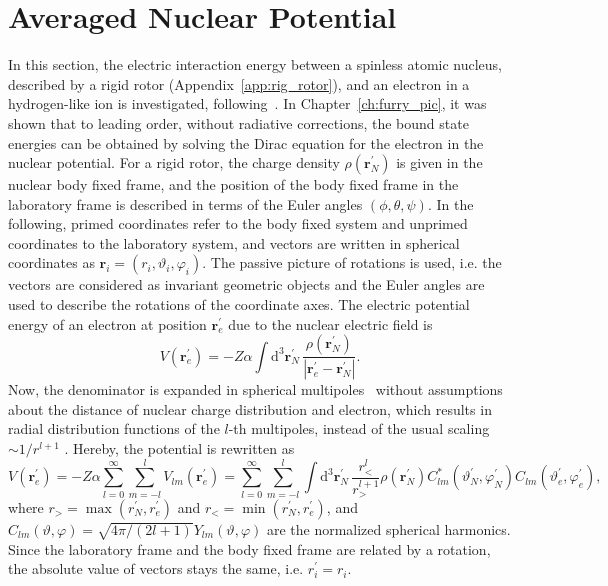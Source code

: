 \section{Averaged Nuclear Potential}
\label{sec:gfac_avpot}
In this section, the electric interaction energy between a spinless atomic nucleus, described by a rigid rotor (Appendix~\ref{app:rig_rotor}), and an electron in a hydrogen-like ion is investigated, following~\cite{kozhedub2008,jacek2012}. In Chapter~\ref{ch:furry_pic}, it was shown that to leading order, without radiative corrections, the bound state energies can be obtained by solving the Dirac equation for the electron in the nuclear potential. For a rigid rotor, the charge density $\rho(\mathbf{r}^{\prime}_N)$ is given in the nuclear body fixed frame, and the position of the body fixed frame in the laboratory frame is described in terms of the Euler angles $(\phi,\theta,\psi)$. In the following, primed coordinates refer to the body fixed system and unprimed coordinates to the laboratory system, and vectors are written in spherical coordinates as $\mathbf{r}_i=(r_i,\vartheta_i,\varphi_i)$. The passive picture of rotations is used, i.e. the vectors are considered as invariant geometric objects and the Euler angles are used to describe the rotations of the coordinate axes. The electric potential energy of an electron at position $\mathbf{r}_{e}^\prime$ due to the nuclear electric field is
\begin{equation}
V(\mathbf{r}_e^\prime)=-Z\alpha \int\mathrm{d}^3\mathbf{r}_N^\prime\,
\frac{\rho(\mathbf{r}_N^\prime)}{\left|\mathbf{r}_e^\prime - \mathbf{r}_N^\prime\right|}.
\end{equation}
Now, the denominator is expanded in spherical multipoles~\cite{jackson1999} without assumptions about the distance of nuclear charge distribution and electron, which results in radial distribution functions of the $l$-th multipoles, instead of the usual scaling $\sim 1/r^{l+1}$ . Hereby, the potential is rewritten as
\begin{equation}
V(\mathbf{r}_e^\prime)=-Z\alpha\sum_{l=0}^\infty \sum_{m=-l}^l V_{lm}(\mathbf{r}_e^\prime)= \sum_{l=0}^\infty \sum_{m=-l}^l
\int\mathrm{d}^3\mathbf{r}_N^{\prime}\,\frac{r_<^l}{r_>^{l+1}}\rho(\mathbf{r}_N^\prime) C_{lm}^*(\vartheta^\prime_N,\varphi_N^\prime) C_{lm}(\vartheta^\prime_e,\varphi_e^\prime),
\label{eq:mulitipoles_1}
\end{equation}
where $r_>=\max(r^\prime_N,r^\prime_e)$ and $r_<=\min(r^\prime_N,r^\prime_e)$, and $C_{lm}(\vartheta,\varphi)=\sqrt{4\pi/(2l+1)}Y_{lm}(\vartheta,\varphi)$ are the normalized spherical harmonics. Since the laboratory frame and the body fixed frame are related by a rotation, the absolute value of vectors stays the same, i.e. $r^\prime_i = r_i$.
